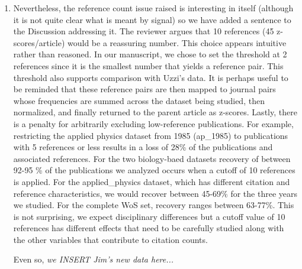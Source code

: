 \documentclass[11pt, oneside]{article}   	%
\begin{document}
\begin{itemize}
\begin{enumerate}
\item Nevertheless, the reference count issue raised is interesting in itself (although it is not quite clear what is meant by signal) so we have added a sentence to the Discussion addressing it. The reviewer argues that 10 references (45 z-scores/article) would be a reassuring number. This choice appears intuitive rather than reasoned. In our manuscript, we chose to set the threshold at 2 references since it is the smallest number that yields a reference pair. This threshold also supports comparison with Uzzi's data. It is perhaps useful to be reminded that these reference pairs are then mapped to journal pairs whose frequencies are summed across the dataset being studied, then normalized, and finally returned to the parent article as z-scores. Lastly, there is a penalty for arbitrarily excluding low-reference publications. For example, restricting the applied physics dataset from 1985 (ap\_1985) to publications with 5 references or less results in a loss of 28\% of the publications and associated references. For the two biology-baed datasets recovery of between 92-95 \% of the publications we analyzed occurs when a cutoff of 10 references is applied. For the applied\_physics dataset, which has different citation and reference characteristics, we would recover between 45-69\% for the three years we studied. For the complete WoS set, recovery ranges between 63-77\%. This is not surprising, we expect disciplinary differences but a cutoff value of 10 references has different effects that need to be carefully studied along with the other variables that contribute to citation counts.

\vspace{3mm} Even so, \emph{we INSERT Jim's new data here... }


\end{enumerate}
\end{itemize}
\end{document}
